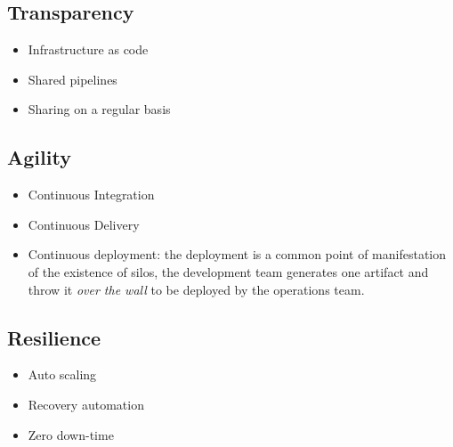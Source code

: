 \subsection{Transparency}
\begin{itemize}
\item Infrastructure as code
\item Shared pipelines
\item Sharing on a regular basis
\end{itemize}

\subsection{Agility}
\begin{itemize}
\item Continuous Integration
\item Continuous Delivery
\item Continuous deployment: the deployment is a common point of manifestation
of the existence of silos, the development team generates one artifact and
throw it \textit{over the wall} to be deployed by the operations team.
\end{itemize}

\subsection{Resilience}
\begin{itemize}
\item Auto scaling
\item Recovery automation
\item Zero down-time
\end{itemize}
